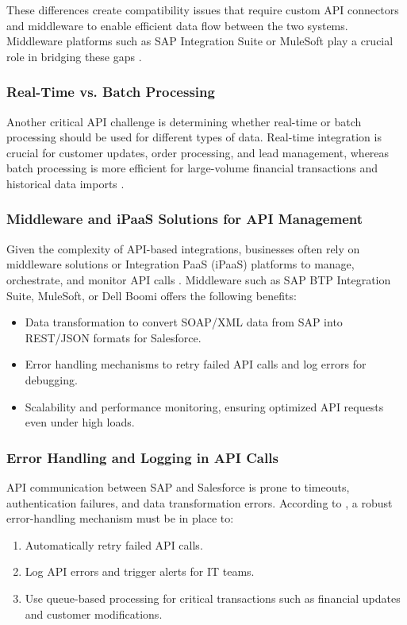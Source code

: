 These differences create compatibility issues that require custom API connectors and middleware to enable efficient data flow between the two systems. Middleware platforms such as SAP Integration Suite or MuleSoft play a crucial role in bridging these gaps \cite{chinta2024}.

\subsubsection{Real-Time vs. Batch Processing}
Another critical API challenge is determining whether real-time or batch processing should be used for different types of data. Real-time integration is crucial for customer updates, order processing, and lead management, whereas batch processing is more efficient for large-volume financial transactions and historical data imports \cite{almudimigh2009}.

\subsubsection{Middleware and iPaaS Solutions for API Management}
Given the complexity of API-based integrations, businesses often rely on middleware solutions or Integration PaaS (iPaaS) platforms to manage, orchestrate, and monitor API calls \cite{chinta2024}. Middleware such as SAP BTP Integration Suite, MuleSoft, or Dell Boomi offers the following benefits:
\begin{itemize}
    \item Data transformation to convert SOAP/XML data from SAP into REST/JSON formats for Salesforce.
    \item Error handling mechanisms to retry failed API calls and log errors for debugging.
    \item Scalability and performance monitoring, ensuring optimized API requests even under high loads.
\end{itemize}

\subsubsection{Error Handling and Logging in API Calls}
API communication between SAP and Salesforce is prone to timeouts, authentication failures, and data transformation errors. According to \cite{chinta2024}, a robust error-handling mechanism must be in place to:
\begin{enumerate}
    \item Automatically retry failed API calls.
    \item Log API errors and trigger alerts for IT teams.
    \item Use queue-based processing for critical transactions such as financial updates and customer modifications.
\end{enumerate}

